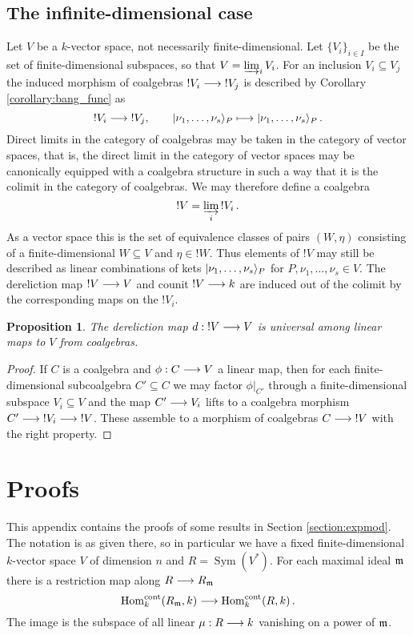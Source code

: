 \documentclass[english,letter paper,12pt,reqno]{article}
\DeclarePairedDelimiter\ket{\lvert}{\rangle}
\newtheorem{proposition}[theorem]{Proposition}
\theoremstyle{example}
\numberwithin{equation}{section}
\def\Hom{\operatorname{Hom}}
\DeclareMathOperator{\Sym}{Sym}
\begin{document}
\subsection{The infinite-dimensional case}\label{section:infinite_dim}

Let $V$ be a $k$-vector space, not necessarily finite-dimensional. Let $\{ V_i \}_{i \in I}$ be the set of finite-dimensional subspaces, so that $V = \varinjlim_i V_i$. For an inclusion $V_i \subseteq V_j$ the induced morphism of coalgebras ${!}V_i \longrightarrow {!}V_j$ is described by Corollary \ref{corollary:bang_func} as
\[
!V_i \lto {!}V_j, \qquad \ket{\nu_1,\ldots,\nu_s}_P \longmapsto \ket{\nu_1,\ldots,\nu_s}_P\,.
\]
Direct limits in the category of coalgebras may be taken in the category of vector spaces, that is, the direct limit in the category of vector spaces may be canonically equipped with a coalgebra structure in such a way that it is the colimit in the category of coalgebras. We may therefore define a coalgebra
\[
!V = \varinjlim_i {!}V_i\,.
\]
As a vector space this is the set of equivalence classes of pairs $(W, \eta)$ consisting of a finite-dimensional $W \subseteq V$ and $\eta \in {!}W$. Thus elements of ${!} V$ may still be described as linear combinations of kets $\ket{\nu_1,\ldots,\nu_s}_P$ for $P, \nu_1,\ldots,\nu_s \in V$. The dereliction map ${!} V \longrightarrow V$ and counit ${!} V \longrightarrow k$ are induced out of the colimit by the corresponding maps on the ${!}V_i$.

\begin{proposition}\label{prop:infinite_v_lifting} The dereliction map $d: {!}V \longrightarrow V$ is universal among linear maps to $V$ from coalgebras.
\end{proposition}
\begin{proof}
If $C$ is a coalgebra and $\phi: C \longrightarrow V$ a linear map, then for each finite-dimensional subcoalgebra $C' \subseteq C$ we may factor $\phi|_{C'}$ through a finite-dimensional subspace $V_i \subseteq V$ and the map $C' \longrightarrow V_i$ lifts to a coalgebra morphism $C' \longrightarrow {!} V_i \longrightarrow {!} V$. These assemble to a morphism of coalgebras $C \longrightarrow {!} V$ with the right property.
\end{proof}

\appendix

\section{Proofs}\label{appendix:proofs}

This appendix contains the proofs of some results in Section \ref{section:expmod}. The notation is as given there, so in particular we have a fixed finite-dimensional $k$-vector space $V$ of dimension $n$ and $R = \Sym(V^*)$. For each maximal ideal $\mathfrak{m}$ there is a restriction map along $R \longrightarrow R_{\mathfrak{m}}$ 
\begin{equation}\label{eq:restrict_map_cont}
\Hom_k^{\cont}(R_{\mf{m}},k) \lto \Hom_k^{\cont}(R,k)\,.
\end{equation}
The image is the subspace of all linear $\mu: R \longrightarrow k$ vanishing on a power of $\mathfrak{m}$.
\end{document}
